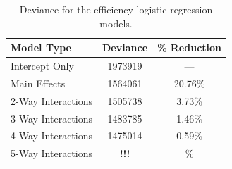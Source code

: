 \documentclass[12pt]{article}
\begin{document}




\clearpage
\begin{table}[ht]
	\centering
	\begin{tabular}{lcc}
  		\hline
		Model Type & Deviance & \% Reduction\\
		\hline
		Intercept Only & 1973919 & ---\\ 
  		Main Effects & 1564061 & 20.76\%\\ 
  		2-Way Interactions & 1505738 & 3.73\%\\ 
  		3-Way Interactions & 1483785 & 1.46\% \\ 
  		4-Way Interactions & 1475014 & 0.59\% \\ 
  		5-Way Interactions & \textbf{!!!} & \% \\ 
   		\hline
	\end{tabular}
	\caption{Deviance for the efficiency logistic regression models.}
	\label{tab:homOrdDev}
\end{table}
\end{document}
